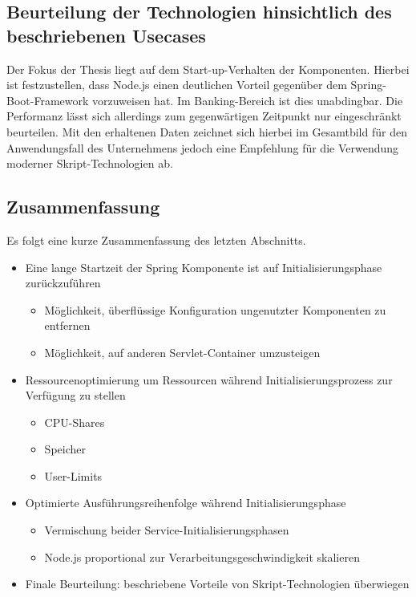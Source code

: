 \subsection{Beurteilung der Technologien hinsichtlich des beschriebenen Usecases}
Der Fokus der Thesis liegt auf dem Start-up-Verhalten der Komponenten. Hierbei ist festzustellen, dass Node.js einen deutlichen Vorteil gegenüber dem Spring-Boot-Framework vorzuweisen hat. Im Banking-Bereich ist dies unabdingbar. Die Performanz lässt sich allerdings zum gegenwärtigen Zeitpunkt nur eingeschränkt beurteilen. Mit den erhaltenen Daten zeichnet sich hierbei im Gesamtbild für den Anwendungsfall des Unternehmens jedoch eine Empfehlung für die Verwendung moderner Skript-Technologien ab. 

\newpage

\subsection{Zusammenfassung}

Es folgt eine kurze Zusammenfassung des letzten Abschnitts.

\begin{itemize}
	\item Eine lange Startzeit der Spring Komponente ist auf Initialisierungsphase zurückzuführen
	\begin{itemize}
		\item Möglichkeit, überflüssige Konfiguration ungenutzter Komponenten zu entfernen
		\item Möglichkeit, auf anderen Servlet-Container umzusteigen
	\end{itemize}
	\item Ressourcenoptimierung um Ressourcen während Initialisierungsprozess zur Verfügung zu stellen
	\begin{itemize}
		\item CPU-Shares
		\item Speicher
		\item User-Limits
	\end{itemize}
	\item Optimierte Ausführungsreihenfolge während Initialisierungsphase
	\begin{itemize}
		\item Vermischung beider Service-Initialisierungsphasen
		\item Node.js proportional zur Verarbeitungsgeschwindigkeit skalieren
	\end{itemize}
	\item Finale Beurteilung: beschriebene Vorteile von Skript-Technologien überwiegen
\end{itemize}
